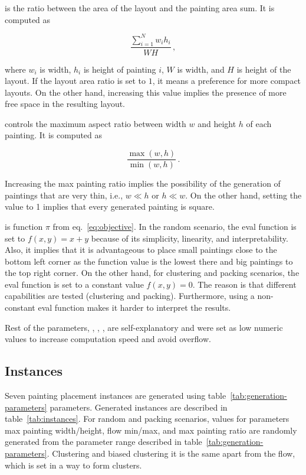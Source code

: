  is the ratio between the area of the layout and the painting area sum.
It is computed as

\[
    \dfrac{\sum\limits_{i=1}^{N} w_i h_i}{WH}\,,
\]

where $w_i$ is width, $h_i$ is height of painting $i$, $W$ is width, and $H$ is height of the layout.
If the layout area ratio is set to $1$, it means a preference for more compact layouts.
On the other hand,
increasing this value implies the presence of more free space in the resulting layout.

 controls the maximum aspect ratio between width $w$ and height $h$ of each painting.
It is computed as

\[
    \dfrac{\max(w,h)}{\min(w,h)}\,.
\]

Increasing the max painting ratio implies the possibility of the generation of paintings
that are very thin, i.e., $w \ll h$ or $h \ll w$.
On the other hand, setting the value to 1
implies that every generated painting is square.

 is function $\pi$ from eq.~\ref{eq:objective}.
In the random scenario, the eval function is set to $f(x,y) = x+y$ because of its simplicity, linearity, and interpretability.
Also, it implies that it is advantageous to place small paintings close to the bottom left corner as the function value is the lowest there and
big paintings to the top right corner.
On the other hand, for clustering and packing scenarios, the eval function is set to a constant value $f(x,y) = 0$.
The reason is that different capabilities are tested (clustering and packing).
Furthermore, using a non-constant eval function makes it harder to interpret the results.

Rest of the parameters, , , , 
are self-explanatory and were set as low numeric values to increase computation speed and avoid overflow.

\subsection{Instances}\label{subsec:instances}

Seven painting placement instances are generated using table~\ref{tab:generation-parameters} parameters.
Generated instances are described in table~\ref{tab:instances}.
For random and packing scenarios, values for parameters max painting width/height, flow min/max, and max painting ratio are randomly generated from the parameter range described in table~\ref{tab:generation-parameters}.
Clustering and biased clustering it is the same apart from the flow, which is set in a way to form clusters.


